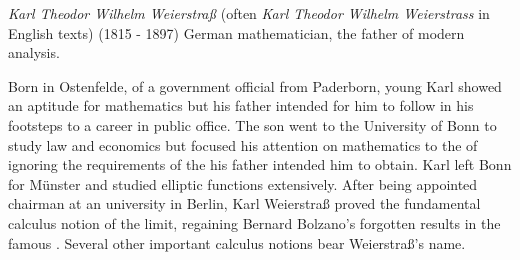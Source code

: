 \documentclass[12pt]{article}
\begin{document}
\emph{Karl Theodor Wilhelm Weierstra{\ss}} (often \emph{Karl Theodor Wilhelm Weierstrass} in English texts) (1815 - 1897) German mathematician, the father of modern analysis.

Born in Ostenfelde, of a government official from Paderborn, young Karl showed an aptitude for mathematics but his father intended for him to follow in his footsteps to a career in public office. The son went to the University of Bonn to study law and economics but focused his attention on mathematics to the  of ignoring the requirements of the  his father intended him to obtain. Karl left Bonn for M\"unster and studied elliptic functions extensively. After being appointed chairman at an university in Berlin, Karl Weierstra{\ss} proved the fundamental calculus notion of the limit, regaining Bernard Bolzano's forgotten results in the famous . Several other important calculus notions bear Weierstra{\ss}'s name.
\end{document}
